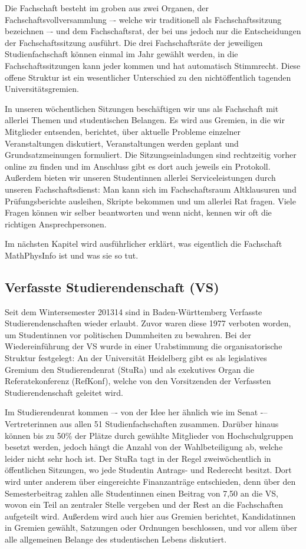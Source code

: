 Die Fachschaft besteht im groben aus zwei Organen, der Fachschaftsvollversammlung –- welche wir traditionell als Fachschaftssitzung bezeichnen –- und dem Fachschaftsrat, der bei uns jedoch nur die Entscheidungen der Fachschaftssitzung ausführt. Die drei Fachschaftsräte der jeweiligen Studienfachschaft können einmal im Jahr gewählt werden, in die Fachschaftssitzungen kann jeder kommen und hat automatisch Stimmrecht. Diese offene Struktur ist ein wesentlicher Unterschied zu den nichtöffentlich tagenden Universitätsgremien. 

In unseren wöchentlichen Sitzungen beschäftigen wir uns als Fachschaft mit allerlei Themen und studentischen Belangen. 
Es wird aus Gremien, in die wir Mitglieder entsenden, berichtet, über aktuelle Probleme einzelner Veranstaltungen diskutiert, Veranstaltungen werden geplant und Grundsatzmeinungen formuliert. Die Sitzungseinladungen sind rechtzeitig vorher online zu finden und im Anschluss gibt es dort auch jeweils ein Protokoll. Außerdem bieten wir unseren Studentinnen allerlei Serviceleistungen durch unseren Fachschaftsdienst: Man kann sich im Fachschaftsraum Altklausuren und Prüfungsberichte ausleihen, Skripte bekommen und um allerlei Rat fragen. Viele Fragen können wir selber beantworten und wenn nicht, kennen wir oft die richtigen Ansprechpersonen.

Im nächsten Kapitel wird ausführlicher erklärt, was eigentlich die Fachschaft MathPhysInfo ist und was sie so tut.

\subsection{Verfasste Studierendenschaft (VS)}
Seit dem Wintersemester 2013\/14 sind in Baden-Württemberg Verfasste Studierendenschaften wieder erlaubt. 
Zuvor waren diese 1977 verboten worden, um Studentinnen vor politischen Dummheiten zu bewahren. 
Bei der Wiedereinführung der VS wurde in einer Urabstimmung die organisatorische Struktur festgelegt: 
An der Universität Heidelberg gibt es als legislatives Gremium den Studierendenrat (StuRa) und als exekutives Organ die Referatekonferenz (RefKonf), welche von den Vorsitzenden der Verfassten Studierendenschaft geleitet wird.

Im Studierendenrat kommen –- von der Idee her ähnlich wie im Senat -– Vertreterinnen aus allen 51 Studienfachschaften zusammen. 
Darüber hinaus können bis zu 50\% der Plätze durch gewählte Mitglieder von Hochschulgruppen besetzt werden, jedoch hängt die Anzahl von der Wahlbeteiligung ab, welche leider nicht sehr hoch ist. 
Der StuRa tagt in der Regel zweiwöchentlich in öffentlichen Sitzungen, wo jede Studentin Antrags- und Rederecht besitzt. 
Dort wird unter anderem über eingereichte Finanzanträge entschieden, denn über den Semesterbeitrag zahlen alle Studentinnen einen Beitrag von 7,50 \EUR an die VS, wovon ein Teil an zentraler Stelle vergeben und der Rest an die Fachschaften aufgeteilt wird. 
Außerdem wird auch hier aus Gremien berichtet, Kandidatinnen in Gremien gewählt, Satzungen oder Ordnungen beschlossen, und vor allem über alle allgemeinen Belange des studentischen Lebens diskutiert.

